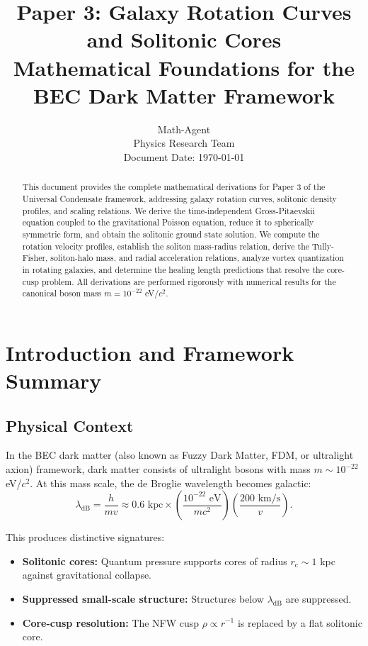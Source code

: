\documentclass[11pt,a4paper]{article}
\title{\textbf{Paper 3: Galaxy Rotation Curves and Solitonic Cores}\\[0.5em]
\large Mathematical Foundations for the BEC Dark Matter Framework}
\author{Math-Agent\\
\small Physics Research Team\\
\small Document Date: \today}
\date{}
\newcommand{\lambdadB}{\ensuremath{\lambda_{\mathrm{dB}}}}
\newcommand{\rc}{\ensuremath{r_{\mathrm{c}}}}
\theoremstyle{definition}
\theoremstyle{remark}
\begin{document}
\maketitle

\begin{abstract}
This document provides the complete mathematical derivations for Paper 3 of the Universal Condensate framework, addressing galaxy rotation curves, solitonic density profiles, and scaling relations. We derive the time-independent Gross-Pitaevskii equation coupled to the gravitational Poisson equation, reduce it to spherically symmetric form, and obtain the solitonic ground state solution. We compute the rotation velocity profiles, establish the soliton mass-radius relation, derive the Tully-Fisher, soliton-halo mass, and radial acceleration relations, analyze vortex quantization in rotating galaxies, and determine the healing length predictions that resolve the core-cusp problem. All derivations are performed rigorously with numerical results for the canonical boson mass $m = 10^{-22}$ eV/$c^2$.
\end{abstract}

\tableofcontents
\newpage

\section{Introduction and Framework Summary}
\label{sec:introduction}

\subsection{Physical Context}

In the BEC dark matter (also known as Fuzzy Dark Matter, FDM, or ultralight axion) framework, dark matter consists of ultralight bosons with mass $m \sim 10^{-22}$ eV/$c^2$. At this mass scale, the de Broglie wavelength becomes galactic:
\begin{equation}
\lambdadB = \frac{h}{mv} \approx 0.6 \text{ kpc} \times \left(\frac{10^{-22} \text{ eV}}{m c^2}\right) \left(\frac{200 \text{ km/s}}{v}\right).
\end{equation}

This produces distinctive signatures:
\begin{itemize}
    \item \textbf{Solitonic cores:} Quantum pressure supports cores of radius $\rc \sim 1$ kpc against gravitational collapse.
    \item \textbf{Suppressed small-scale structure:} Structures below $\lambdadB$ are suppressed.
    \item \textbf{Core-cusp resolution:} The NFW cusp $\rho \propto r^{-1}$ is replaced by a flat solitonic core.
\end{itemize}
\end{document}
